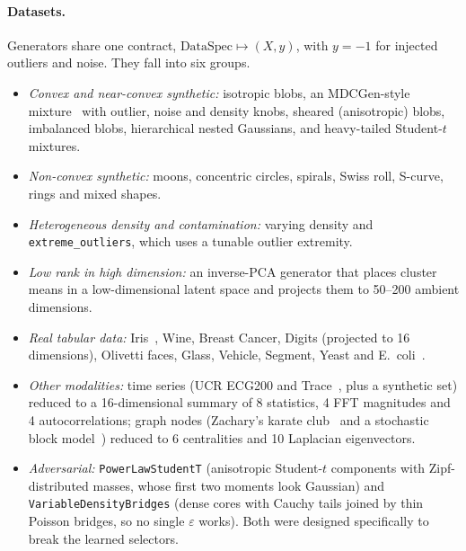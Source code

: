 \documentclass[11pt,a4paper]{article}
\newcommand{\code}[1]{\texttt{#1}}
\begin{document}
\paragraph{Datasets.} Generators share one contract,
$\text{DataSpec} \mapsto (X, y)$, with $y = -1$ for injected outliers and
noise. They fall into six groups.
\begin{itemize}
  \item \emph{Convex and near-convex synthetic:} isotropic blobs, an
  MDCGen-style mixture~\cite{iglesias2019mdcgen} with outlier, noise and
  density knobs, sheared (anisotropic) blobs, imbalanced blobs, hierarchical
  nested Gaussians, and heavy-tailed Student-$t$ mixtures.
  \item \emph{Non-convex synthetic:} moons, concentric circles, spirals, Swiss
  roll, S-curve, rings and mixed shapes.
  \item \emph{Heterogeneous density and contamination:} varying density and
  \code{extreme\_outliers}, which uses a tunable outlier extremity.
  \item \emph{Low rank in high dimension:} an inverse-PCA generator that places
  cluster means in a low-dimensional latent space and projects them to
  50--200 ambient dimensions.
  \item \emph{Real tabular data:} Iris~\cite{fisher1936use}, Wine, Breast
  Cancer, Digits (projected to 16 dimensions), Olivetti faces, Glass,
  Vehicle, Segment, Yeast and E.~coli~\cite{dua2019uci}.
  \item \emph{Other modalities:} time series (UCR
  ECG200 and Trace~\cite{dau2019ucr}, plus a synthetic set) reduced to a
  16-dimensional summary of 8 statistics, 4 FFT magnitudes and 4
  autocorrelations; graph nodes (Zachary's karate
  club~\cite{zachary1977information} and a stochastic block
  model~\cite{holland1983stochastic}) reduced to 6 centralities and 10
  Laplacian eigenvectors.
  \item \emph{Adversarial:} \code{PowerLawStudentT} (anisotropic Student-$t$
  components with Zipf-distributed masses, whose first two moments look
  Gaussian) and \code{VariableDensityBridges} (dense cores with Cauchy tails
  joined by thin Poisson bridges, so no single $\varepsilon$ works). Both were
  designed specifically to break the learned selectors.
\end{itemize}
\end{document}
